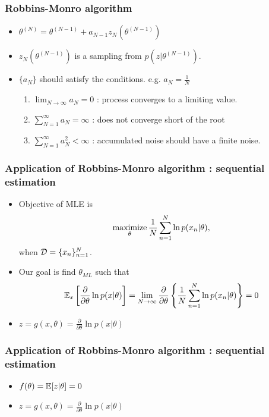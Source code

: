 \documentclass[10pt,mathserif]{beamer}
\begin{document}
\begin{frame}
\frametitle{Robbins-Monro algorithm}
\begin{itemize}\itemsep=12pt
    \item $\theta^{(N)} = \theta^{(N-1)}+a_{N-1}z_N(\theta^{(N-1)})$
    \item $z_N(\theta^{(N-1)})$ is a sampling from $p(z|\theta^{(N-1)})$.
    \item $\{a_N\}$ should satisfy the conditions. e.g. $a_N=\frac{1}{N}$
    \begin{enumerate}\itemsep=12pt
        \item $\lim_{N\rightarrow \infty} a_N = 0$ :  process converges to a limiting value.
        \item $\sum_{N=1}^{\infty} a_N = \infty$ : does not converge short of the root
        \item $\sum_{N=1}^{\infty} a_N^2 < \infty$ : accumulated noise should have a finite noise.
    \end{enumerate}
\end{itemize}
\end{frame}

\begin{frame}
\frametitle{Application of Robbins-Monro algorithm : sequential estimation}
\begin{itemize}\itemsep=12pt
\item Objective of MLE is 
\begin{align}
\operatorname*{maximize}_{\theta} \frac{1}{N} \sum_{n=1}^N \ln p(x_n|\theta), \nonumber
\end{align}
when $\mathcal{D} = \{x_n\}_{n=1}^N$.
\item Our goal is find $\theta_{ML}$ such that
\begin{align}
    \mathbb{E}_x \left[\frac{\partial}{\partial \theta} \ln p(x|\theta)\right] = \lim_{N\rightarrow \infty}\frac{\partial}{\partial \theta} \left\{\frac{1}{N} \sum_{n=1}^N \ln p(x_n|\theta) \right\} = 0\nonumber
\end{align}
\item $z = g(x,\theta) = \frac{\partial}{\partial \theta} \ln p(x|\theta)$
\end{itemize}
\end{frame}
\begin{frame}
\frametitle{Application of Robbins-Monro algorithm : sequential estimation}
\begin{itemize}\itemsep=12pt
\item $f(\theta) = \mathbb{E} [z|\theta] = 0$
\item $z = g(x,\theta) = \frac{\partial}{\partial \theta} \ln p(x|\theta)$
\end{itemize}
\end{frame}
\end{document}
